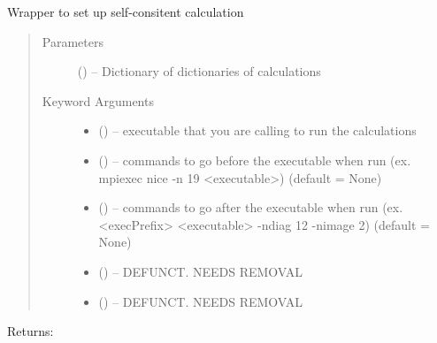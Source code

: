 \documentclass[letterpaper,10pt,english]{sphinxmanual}
\begin{document}

\begin{fulllineitems}
\label{\detokenize{run:run.scf}}
Wrapper to set up self-consitent calculation
\begin{quote}\begin{description}
\item[{Parameters}] \leavevmode
{} () -- Dictionary of dictionaries of calculations

\item[{Keyword Arguments}] \leavevmode\begin{itemize}
\item {} 
 () -- executable that you are calling to run the calculations

\item {} 
 () -- commands to go before the executable when run
(ex. mpiexec nice -n 19 \textless{}executable\textgreater{}) (default = None)

\item {} 
 () -- commands to go after the executable when run
(ex. \textless{}execPrefix\textgreater{} \textless{}executable\textgreater{} -ndiag 12 -nimage 2) (default = None)

\item {} 
 () -- DEFUNCT. NEEDS REMOVAL

\item {} 
 () -- DEFUNCT. NEEDS REMOVAL

\end{itemize}

\end{description}\end{quote}

Returns:

\end{fulllineitems}

\end{document}
